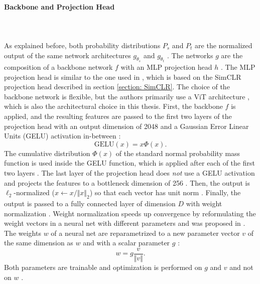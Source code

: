 \paragraph{Backbone and Projection Head} \mbox{} \\
\\
As explained before, both probability distributions $P_s$ and $P_t$ are the normalized output of the same network architectures $g_{\theta_s}$ and $g_{\theta_t}$ \citep{Caron2021}.
The networks $g$ are the composition of a backbone network $f$ with an MLP projection head $h$ \citep{Caron2021}.
The MLP projection head is similar to the one used in \citep{Caron2020}, which is based on the SimCLR projection head described in section \ref{section: SimCLR}.
The choice of the backbone network is flexible, but the authors primarily use a ViT architecture \citep{Dosovitskiy2020}, which is also the architectural choice in this thesis.
First, the backbone $f$ is applied, and the resulting features are passed to the first two layers of the projection head with an output dimension of 2048 and a Gaussian Error Linear Units (GELU) activation in-between \citep{Hendrycks2016b}:
\begin{equation}
\text{GELU}(x) = x \Phi(x).
\end{equation}
The cumulative distribution $\Phi(x)$ of the standard normal probability mass function is used inside the GELU function, which is applied after each of the first two layers \citep{Hendrycks2016b}.
The last layer of the projection head does \textit{not} use a GELU activation and projects the features to a bottleneck dimension of 256 \citep{Caron2021}.
Then, the output is $\ell_2$-normalized ($x \leftarrow x/\Vert x \Vert_2$) so that each vector has unit norm \citep{Caron2021}.
Finally, the output is passed to a fully connected layer of dimension $D$ with weight normalization \citep{Salimans2016}.
Weight normalization speeds up convergence by reformulating the weight vectors in a neural net with different parameters and was proposed in \citep{Salimans2016}.
The weights $w$ of a neural net are reparametrized to a new parameter vector $v$ of the same dimension as $w$ and with a scalar parameter $g$ \citep{Salimans2016}:
\begin{equation}
	w = g \frac{v}{\Vert v \Vert}.
\end{equation}
Both parameters are trainable and optimization is performed on $g$ and $v$ and not on $w$ \citep{Salimans2016}.
